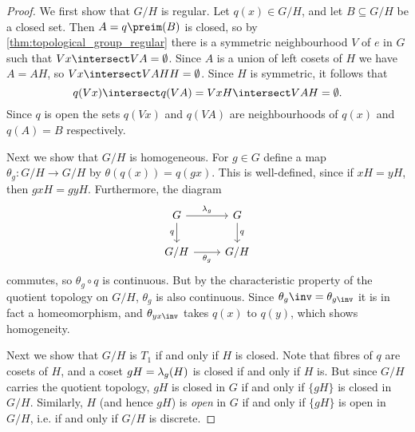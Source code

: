 \documentclass[article, a4paper, 11pt, oneside]{memoir}
\numberwithin{equation}{chapter}
\begin{document}

\begin{proof}
    We first show that $G/H$ is regular. Let $q(x) \in G/H$, and let $B \subseteq G/H$ be a closed set. Then $A = q\preim(B)$ is closed, so by \cref{thm:topological_group_regular} there is a symmetric neighbourhood $V$ of $e$ in $G$ such that $Vx \intersect VA = \emptyset$. Since $A$ is a union of left cosets of $H$ we have $A = AH$, so $Vx \intersect VAHH = \emptyset$. Since $H$ is symmetric, it follows that
    \begin{equation*}
        q(Vx) \intersect q(VA)
            = VxH \intersect VAH
            = \emptyset.
    \end{equation*}
    Since $q$ is open the sets $q(Vx)$ and $q(VA)$ are neighbourhoods of $q(x)$ and $q(A) = B$ respectively.

    Next we show that $G/H$ is homogeneous. For $g \in G$ define a map $\theta_g \colon G/H \to G/H$ by $\theta(q(x)) = q(gx)$. This is well-defined, since if $xH = yH$, then $gxH = gyH$. Furthermore, the diagram
    \begin{equation*}
        \begin{tikzcd}
            G
                \ar[r, "\leftmult_g"]
                \ar[d, "q", swap]
            & G
                \ar[d, "q"] \\
            G/H
                \ar[r, "\theta_g", swap]
            & G/H
        \end{tikzcd}
    \end{equation*}
    commutes, so $\theta_g \circ q$ is continuous. But by the characteristic property of the quotient topology on $G/H$, $\theta_g$ is also continuous. Since $\theta_g\inv = \theta_{g\inv}$ it is in fact a homeomorphism, and $\theta_{yx\inv}$ takes $q(x)$ to $q(y)$, which shows homogeneity.

    Next we show that $G/H$ is $T_1$ if and only if $H$ is closed. Note that fibres of $q$ are cosets of $H$, and a coset $gH = \lambda_g(H)$ is closed if and only if $H$ is. But since $G/H$ carries the quotient topology, $gH$ is closed in $G$ if and only if $\{gH\}$ is closed in $G/H$. Similarly, $H$ (and hence $gH$) is \emph{open} in $G$ if and only if $\{gH\}$ is open in $G/H$, i.e. if and only if $G/H$ is discrete.
\end{proof}
\end{document}
